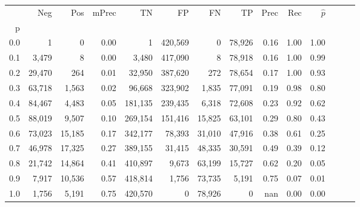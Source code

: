 \begin{tabular}{rrrrrrrrrrrrrr}
\toprule
{} &     Neg &     Pos & mPrec &       TN &       FP &      FN &      TP &  Prec &   Rec & $\hat{p}$ \\
p   &         &         &       &          &          &         &         &       &       &           \\
\midrule
0.0 &       1 &       0 &  0.00 &        1 &  420,569 &       0 &  78,926 &  0.16 &  1.00 &      1.00 \\
0.1 &   3,479 &       8 &  0.00 &    3,480 &  417,090 &       8 &  78,918 &  0.16 &  1.00 &      0.99 \\
0.2 &  29,470 &     264 &  0.01 &   32,950 &  387,620 &     272 &  78,654 &  0.17 &  1.00 &      0.93 \\
0.3 &  63,718 &   1,563 &  0.02 &   96,668 &  323,902 &   1,835 &  77,091 &  0.19 &  0.98 &      0.80 \\
0.4 &  84,467 &   4,483 &  0.05 &  181,135 &  239,435 &   6,318 &  72,608 &  0.23 &  0.92 &      0.62 \\
0.5 &  88,019 &   9,507 &  0.10 &  269,154 &  151,416 &  15,825 &  63,101 &  0.29 &  0.80 &      0.43 \\
0.6 &  73,023 &  15,185 &  0.17 &  342,177 &   78,393 &  31,010 &  47,916 &  0.38 &  0.61 &      0.25 \\
0.7 &  46,978 &  17,325 &  0.27 &  389,155 &   31,415 &  48,335 &  30,591 &  0.49 &  0.39 &      0.12 \\
0.8 &  21,742 &  14,864 &  0.41 &  410,897 &    9,673 &  63,199 &  15,727 &  0.62 &  0.20 &      0.05 \\
0.9 &   7,917 &  10,536 &  0.57 &  418,814 &    1,756 &  73,735 &   5,191 &  0.75 &  0.07 &      0.01 \\
1.0 &   1,756 &   5,191 &  0.75 &  420,570 &        0 &  78,926 &       0 &   nan &  0.00 &      0.00 \\
\bottomrule
\end{tabular}
